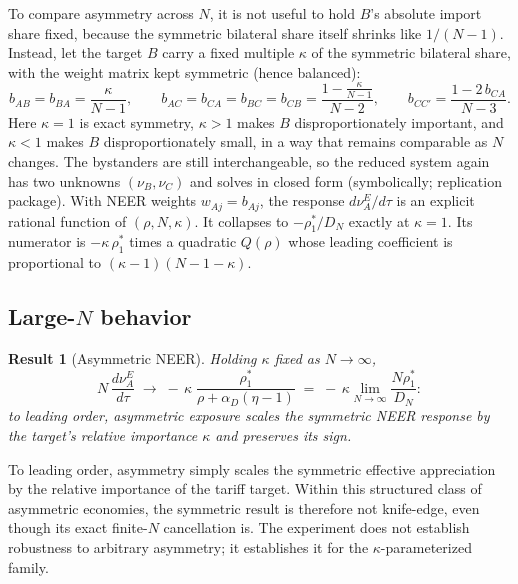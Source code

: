 \documentclass[11pt]{article}
\newtheorem{result}{Result}[section]
\begin{document}
To compare asymmetry across $N$, it is not useful to hold $B$'s absolute import share fixed, because the symmetric bilateral share itself shrinks like $1/(N-1)$. Instead, let the target $B$ carry a fixed multiple $\kappa$ of the symmetric bilateral share, with the weight matrix kept symmetric (hence balanced):
\begin{equation}
b_{AB} = b_{BA} = \frac{\kappa}{N-1},
\qquad
b_{AC} = b_{CA} = b_{BC} = b_{CB} = \frac{1 - \frac{\kappa}{N-1}}{N-2},
\qquad
b_{CC'} = \frac{1 - 2\,b_{CA}}{N-3} .
\label{eq:kappa-b}
\end{equation}
Here $\kappa = 1$ is exact symmetry, $\kappa > 1$ makes $B$ disproportionately important, and $\kappa < 1$ makes $B$ disproportionately small, in a way that remains comparable as $N$ changes. The bystanders are still interchangeable, so the reduced system again has two unknowns $(\nu_B, \nu_C)$ and solves in closed form (symbolically; replication package). With NEER weights $w_{Aj} = b_{Aj}$, the response $d\nu_A^E/d\tau$ is an explicit rational function of $(\rho, N, \kappa)$. It collapses to $-\rho_1^*/D_N$ exactly at $\kappa = 1$. Its numerator is $-\kappa\,\rho_1^*$ times a quadratic $Q(\rho)$ whose leading coefficient is proportional to $(\kappa - 1)(N - 1 - \kappa)$.

\subsection{Large-$N$ behavior}

\begin{result}[Asymmetric NEER]
Holding $\kappa$ fixed as $N \to \infty$,
\begin{equation}
N\,\frac{d\nu_A^E}{d\tau}
\;\longrightarrow\;
-\,\kappa\;\frac{\rho_1^*}{\rho + \alpha_D(\eta-1)}
\;=\; -\,\kappa \lim_{N\to\infty}\frac{N\rho_1^*}{D_N} :
\label{eq:kappa-neer}
\end{equation}
to leading order, asymmetric exposure scales the symmetric NEER response by the target's relative importance $\kappa$ and preserves its sign.
\end{result}

To leading order, asymmetry simply scales the symmetric effective appreciation by the relative importance of the tariff target. Within this structured class of asymmetric economies, the symmetric result is therefore not knife-edge, even though its exact finite-$N$ cancellation is. The experiment does not establish robustness to arbitrary asymmetry; it establishes it for the $\kappa$-parameterized family.
\end{document}
